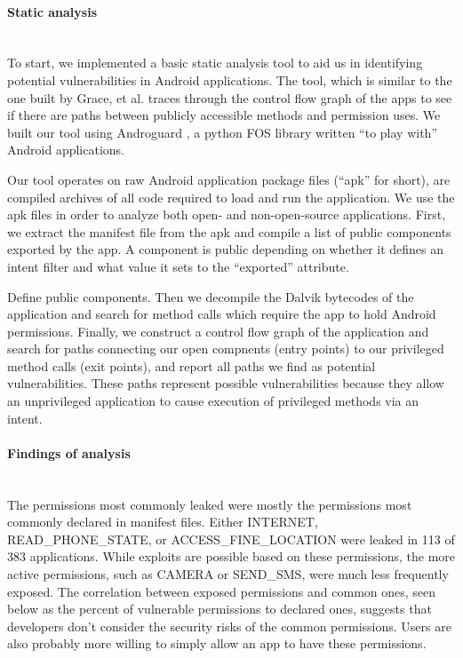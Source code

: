 \documentclass[12pt,a4paper]{article} \usepackage{verbatim}
\begin{document}
\paragraph{Static analysis} ~\\

To start, we implemented a basic static analysis tool to aid us in identifying
potential vulnerabilities in Android applications. The tool, which is similar to the one built by Grace, et al. \cite{grace_systematic_2012} traces through the control flow graph of the apps to see if there are paths between publicly accessible methods and permission uses. We built our tool using
Androguard \cite{androguard}, a python FOS library written ``to play with''
Android applications.

Our tool operates on raw Android application package files (``apk'' for short),
are compiled archives of all code required to load and run the application. We
use the apk files in order to analyze both open- and non-open-source
applications. First, we extract the manifest file from the apk and compile a
list of public components exported by the app. A component is public depending
on whether it defines an intent filter and what value it sets to the
``exported'' attribute.

Define public components. Then we decompile the
Dalvik bytecodes of the application and search for method calls which require
the app to hold Android permissions. Finally, we construct a control flow graph
of the application and search for paths connecting our open compnents (entry
points) to our privileged method calls (exit points), and report all paths we
find as potential vulnerabilities. These paths represent possible
vulnerabilities because they allow an unprivileged application to cause
execution of privileged methods via an intent.

\paragraph{Findings of analysis} ~\\

The permissions most commonly leaked were mostly the permissions most commonly
declared in manifest files. Either INTERNET, READ\_PHONE\_STATE, or
ACCESS\_FINE\_LOCATION were leaked in 113 of 383 applications. While exploits
are possible based on these permissions, the more active permissions, such as
CAMERA or SEND\_SMS, were much less frequently exposed. The correlation between
exposed permissions and common ones, seen below as the percent of vulnerable
permissions to declared ones, suggests that developers don't consider the
security risks of the common permissions. Users are also probably more willing
to simply allow an app to have these permissions.
\end{document}
